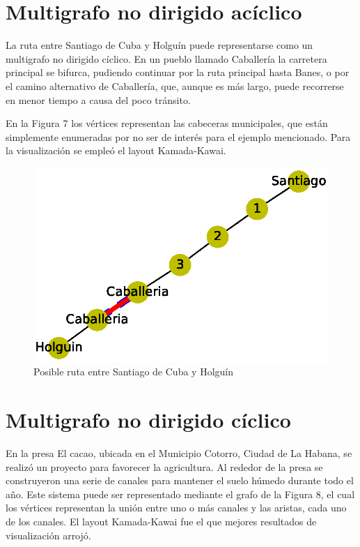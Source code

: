 \documentclass{article}
\begin{document}
\section{Multigrafo no dirigido acíclico}

La ruta entre Santiago de Cuba y Holguín puede representarse  como un multigrafo no dirigido cíclico. En un pueblo llamado Caballería la carretera principal se bifurca, pudiendo continuar por la ruta principal hasta Banes, o por el camino alternativo de Caballería, que, aunque es más largo, puede recorrerse en menor tiempo a causa del poco tránsito.

En la Figura 7 los vértices representan las cabeceras municipales, que están simplemente enumeradas por no ser de interés para el ejemplo mencionado. Para la visualización se empleó el layout Kamada-Kawai.

\begin{figure}
  \includegraphics[width=.8\columnwidth]{fig7.eps}
  \caption{Posible ruta entre Santiago de Cuba y Holguín}
  \label{Figura 7}
\end{figure}




\section{Multigrafo no dirigido cíclico}

En la presa El cacao, ubicada en el Municipio Cotorro, Ciudad de La Habana, se realizó un proyecto para favorecer la agricultura. Al rededor de la presa se construyeron una serie de canales para mantener el suelo húmedo durante todo el año.
Este sistema puede ser representado mediante el grafo de la Figura 8, el cual los vértices representan la unión entre uno o más canales y las aristas, cada uno de los canales. El layout Kamada-Kawai fue el que mejores resultados de visualización arrojó.
\end{document}
